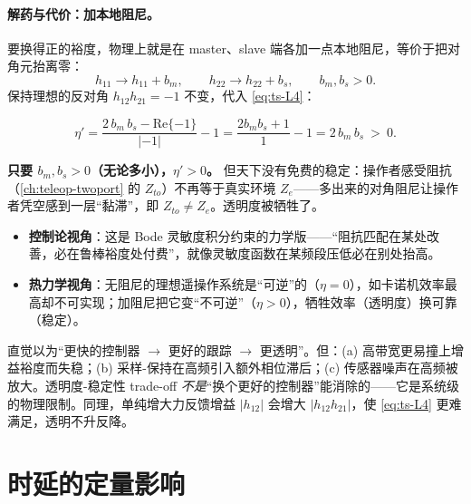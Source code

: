 \paragraph{解药与代价：加本地阻尼。}
要换得正的裕度，物理上就是在 master、slave 端各加一点本地阻尼，等价于把对角元抬离零：
\begin{equation}
  h_{11}\to h_{11}+b_m,\qquad h_{22}\to h_{22}+b_s,\qquad b_m,b_s>0.
  \label{eq:ts-add-damp}
\end{equation}
保持理想的反对角 $h_{12}h_{21}=-1$ 不变，代入 \cref{eq:ts-L4}：

\begin{derivation}
\begin{equation}
  \eta'=\frac{2\,b_m\,b_s-\mathrm{Re}\{-1\}}{|-1|}-1=\frac{2b_mb_s+1}{1}-1=2\,b_m\,b_s\ >\ 0.
  \label{eq:ts-eta-prime}
\end{equation}
\end{derivation}

\noindent\textbf{只要 $b_m,b_s>0$（无论多小），$\eta'>0$。} 但天下没有免费的稳定：操作者感受阻抗（\cref{ch:teleop-twoport} 的 $Z_{to}$）不再等于真实环境 $Z_e$——多出来的对角阻尼让操作者凭空感到一层“黏滞”，即 $Z_{to}\neq Z_e$。透明度被牺牲了。

\begin{insight}
\begin{itemize}
  \item \textbf{控制论视角}：这是 Bode 灵敏度积分约束的力学版——“阻抗匹配在某处改善，必在鲁棒裕度处付费”，就像灵敏度函数在某频段压低必在别处抬高。
  \item \textbf{热力学视角}：无阻尼的理想遥操作系统是“可逆”的（$\eta=0$），如卡诺机效率最高却不可实现；加阻尼把它变“不可逆”（$\eta>0$），牺牲效率（透明度）换可靠（稳定）。
\end{itemize}
\end{insight}

\begin{pitfall}
直觉以为“更快的控制器 $\to$ 更好的跟踪 $\to$ 更透明”。但：(a) 高带宽更易撞上增益裕度而失稳；(b) 采样-保持在高频引入额外相位滞后；(c) 传感器噪声在高频被放大。透明度-稳定性 trade-off \emph{不是}“换个更好的控制器”能消除的——它是系统级的物理限制。同理，单纯增大力反馈增益 $|h_{12}|$ 会增大 $|h_{12}h_{21}|$，使 \cref{eq:ts-L4} 更难满足，透明不升反降。
\end{pitfall}

\section{时延的定量影响}
\label{sec:ts-delay}


